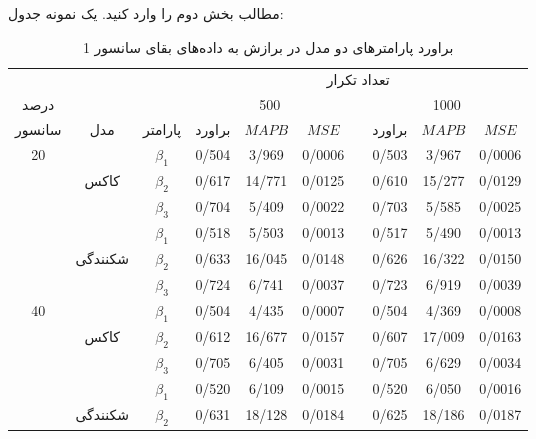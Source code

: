 مطالب بخش دوم را وارد کنید. یک نمونه جدول:
\begin{table}
\caption{براورد پارامترهای دو مدل در برازش به داده‌های بقای سانسور 1 \label{TabAa31}}%
\centering
\begin{tabular}{cccccccccc}
\\
\hline 
		&	&      &     \multicolumn{7}{c}{تعداد تکرار}\\
\cline{4-10}
درصد		&	&      &     \multicolumn{3}{c}{500} & & \multicolumn{3}{c}{1000}\\
\cline{4-6} \cline{8-10}
سانسور & مدل & پارامتر &  براورد & $MAPB$ & $MSE$ & & براورد & $MAPB$ & $MSE$ \\
\hline
\multirow{6}{*}{20} &
	& $\beta_1$ & 0/504 & 3/969 & 0/0006 & & 0/503 & 3/967 & 0/0006 \\
&کاکس& $\beta_2$ & 0/617 & 14/771 & 0/0125 & & 0/610 & 15/277 & 0/0129 \\
\vspace{2mm}
&	& $\beta_3$ & 0/704 & 5/409 & 0/0022 & & 0/703 & 5/585 & 0/0025 \\
&	& $\beta_1$ & 0/518 & 5/503 & 0/0013 & & 0/517 & 5/490 & 0/0013 \\
&شکنندگی & $\beta_2$ & 0/633 & 16/045 & 0/0148 & & 0/626 & 16/322 & 0/0150  \\
\vspace{2mm}
&	& $\beta_3$ & 0/724 & 6/741 & 0/0037 & & 0/723 & 6/919 & 0/0039 \\
\multirow{6}{*}{40} &
	& $\beta_1$ & 0/504 & 4/435 & 0/0007 & & 0/504 & 4/369 & 0/0008 \\
&کاکس& $\beta_2$ & 0/612 & 16/677 & 0/0157 & & 0/607 & 17/009 & 0/0163 \\
\vspace{2mm}
&	& $\beta_3$ & 0/705 & 6/405 & 0/0031 & & 0/705 & 6/629 & 0/0034 \\
&	& $\beta_1$ & 0/520 & 6/109 & 0/0015 & & 0/520 & 6/050 & 0/0016 \\
&شکنندگی & $\beta_2$ & 0/631 & 18/128 & 0/0184 & & 0/625 & 18/186 & 0/0187 \\
\hline
\end{tabular}
\end{table}